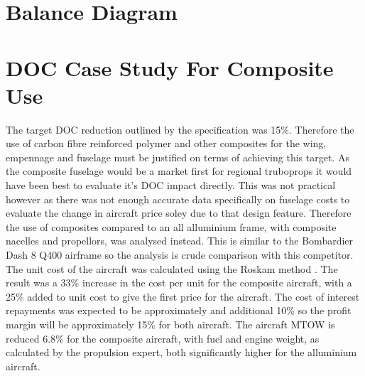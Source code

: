 \documentclass[11pt]{article}
\begin{document}
\section{Balance Diagram}

\section{DOC Case Study For Composite Use}

The target DOC reduction outlined by the specification was 15\%. Therefore the use of carbon fibre reinforced polymer and other composites for the wing, empennage and fuselage must be justified on terms of achieving this target. As the composite fuselage would be a market first for regional truboprops it would have been best to evaluate it's DOC impact directly. This was not practical however as there was not enough accurate data specifically on fuselage costs to evaluate the change in aircraft price soley due to that design feature. Therefore the use of composites compared to an all alluminium frame, with composite nacelles and propellors, was analysed instead. This is similar to the Bombardier Dash 8 Q400 airframe so the analysis is crude comparison with this competitor. \\
The unit cost of the aircraft was calculated using the Roskam method \cite{R8}. The result was a 33\% increase in the cost per unit for the composite aircraft, with a 25\% added to unit cost to give the first price for the aircraft. The cost of interest repayments was expected to be approximately and additional 10\% so the profit margin will be approximately 15\% for both aircraft. The aircraft MTOW is reduced 6.8\% for the composite aircraft, with fuel and engine weight, as calculated by the propulsion expert, both significantly higher for the alluminium aircraft.



\pagebreak


\pagebreak



\pagebreak
\end{document}
